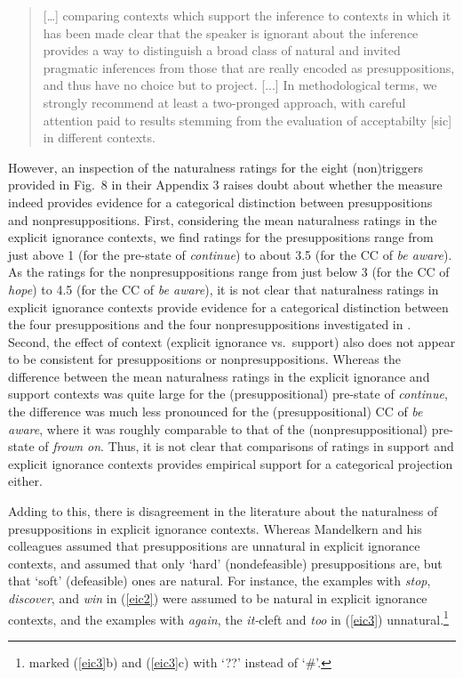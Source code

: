 \documentclass[11pt,fleqn]{article}
\newcommand{\6}{\mbox{$[\hspace*{-.6mm}[$}}
\newcommand{\9}{\mbox{$]\hspace*{-.6mm}]$}}
\begin{document}
\begin{quote}

[\ldots] comparing contexts which support the inference to contexts in which it has been made clear that the speaker is ignorant about the inference provides a way to distinguish a broad class of natural and invited pragmatic inferences from those that are really encoded as presuppositions, and thus have no choice but to project. [...]  In methodological terms, we strongly recommend at least a two-pronged approach, with careful attention paid to results stemming from the evaluation of acceptabilty [sic] in different contexts.

\end{quote}

However, an inspection of the naturalness ratings for the eight (non)triggers provided in Fig.~8 in their Appendix 3 raises doubt about whether the measure indeed provides evidence for a categorical distinction between presuppositions and nonpresuppositions. First, considering the mean naturalness ratings in the explicit ignorance contexts, we find ratings for the presuppositions range from just above 1 (for the pre-state of {\em continue}) to about 3.5 (for the CC of {\em be aware}). As the ratings for the nonpresuppositions range from just below 3 (for the CC of {\em hope}) to 4.5 (for the CC of {\em be aware}), it is not clear that naturalness ratings in explicit ignorance contexts provide evidence for a categorical distinction between the four presuppositions and the four nonpresuppositions investigated in \citealt{mandelkern-etal2020}. Second, the effect of context (explicit ignorance vs.\ support) also does not appear to be consistent for presuppositions or nonpresuppositions. Whereas the difference between the mean naturalness ratings in the explicit ignorance and support contexts was quite large for the (presuppositional) pre-state of {\em continue}, the difference was much less pronounced for the (presuppositional) CC of {\em be aware}, where it was roughly comparable to that of the (nonpresuppositional) pre-state of {\em frown on}. Thus, it is not clear that comparisons of ratings in support and explicit ignorance contexts provides empirical support for a categorical projection either. 

Adding to this, there is disagreement in the literature about the naturalness of presuppositions in explicit ignorance contexts. Whereas Mandelkern and his colleagues assumed that presuppositions are unnatural in explicit ignorance contexts, \citealt{simons01} and \citealt{abusch10} assumed that only `hard' (nondefeasible) presuppositions are, but that `soft' (defeasible) ones are natural. For instance,  the examples with {\em stop}, {\em discover}, and {\em win} in (\ref{eic2}) were assumed to be natural in explicit ignorance contexts, and the examples with {\em again}, the {\em it-}cleft and {\em too} in (\ref{eic3}) unnatural.\footnote{\citealt{abusch10} marked (\ref{eic3}b) and (\ref{eic3}c) with `??' instead of `$\#$'.} 
\end{document}
